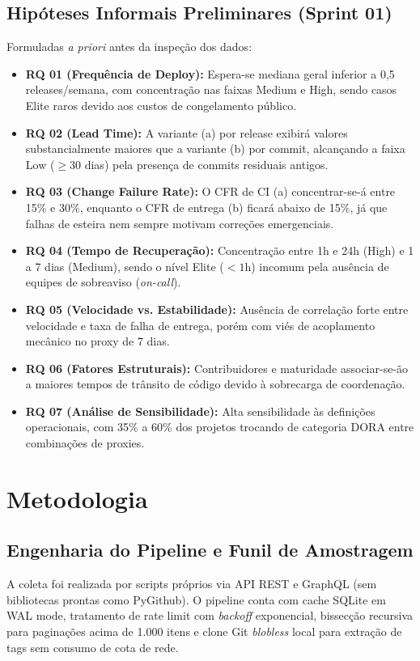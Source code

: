 \documentclass[12pt]{article}
\begin{document}
\subsection{Hipóteses Informais Preliminares (Sprint 01)}
Formuladas \textit{a priori} antes da inspeção dos dados:
\begin{itemize}
    \item \textbf{RQ 01 (Frequência de Deploy):} Espera-se mediana geral inferior a 0,5 releases/semana, com concentração nas faixas Medium e High, sendo casos Elite raros devido aos custos de congelamento público.
    \item \textbf{RQ 02 (Lead Time):} A variante (a) por release exibirá valores substancialmente maiores que a variante (b) por commit, alcançando a faixa Low ($\ge 30$ dias) pela presença de commits residuais antigos.
    \item \textbf{RQ 03 (Change Failure Rate):} O CFR de CI (a) concentrar-se-á entre 15\% e 30\%, enquanto o CFR de entrega (b) ficará abaixo de 15\%, já que falhas de esteira nem sempre motivam correções emergenciais.
    \item \textbf{RQ 04 (Tempo de Recuperação):} Concentração entre 1h e 24h (High) e 1 a 7 dias (Medium), sendo o nível Elite ($< 1$h) incomum pela ausência de equipes de sobreaviso (\textit{on-call}).
    \item \textbf{RQ 05 (Velocidade vs. Estabilidade):} Ausência de correlação forte entre velocidade e taxa de falha de entrega, porém com viés de acoplamento mecânico no proxy de 7 dias.
    \item \textbf{RQ 06 (Fatores Estruturais):} Contribuidores e maturidade associar-se-ão a maiores tempos de trânsito de código devido à sobrecarga de coordenação.
    \item \textbf{RQ 07 (Análise de Sensibilidade):} Alta sensibilidade às definições operacionais, com 35\% a 60\% dos projetos trocando de categoria DORA entre combinações de proxies.
\end{itemize}

\section{Metodologia}

\subsection{Engenharia do Pipeline e Funil de Amostragem}
A coleta foi realizada por scripts próprios via API REST e GraphQL (sem bibliotecas prontas como PyGithub). O pipeline conta com cache SQLite em WAL mode, tratamento de rate limit com \textit{backoff} exponencial, bissecção recursiva para paginações acima de 1.000 itens e clone Git \textit{blobless} local para extração de tags sem consumo de cota de rede.
\end{document}
